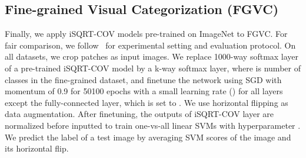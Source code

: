\documentclass[10pt,twocolumn,letterpaper]{article}
\begin{document}
\subsection{Fine-grained Visual Categorization (FGVC)}

Finally, we apply  iSQRT-COV models pre-trained on ImageNet to FGVC. 
For fair comparison, we follow~\cite{lin2015bilinear} for experimental setting and evaluation protocol. On all  datasets, we crop  patches as input images.  We replace  1000-way softmax layer of a pre-trained iSQRT-COV model by a k-way softmax layer, where  is number of classes in the fine-grained dataset, and finetune the network using SGD with momentum of 0.9 for 50100 epochs with a small learning rate () for all layers except the fully-connected layer, which is set to . We use horizontal flipping as data augmentation. After finetuning, the outputs of iSQRT-COV layer are  normalized before inputted to train  one-vs-all linear SVMs with hyperparameter . We predict the label of a test image  by averaging SVM scores of the  image and its horizontal flip.   
\end{document}
